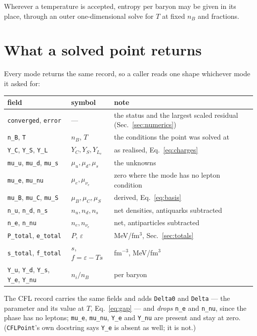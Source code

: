 \documentclass[aps,prc,onecolumn,superscriptaddress,nofootinbib,10pt]{revtex4-2}
\newcommand{\nB}{n_B}
\newcommand{\muB}{\mu_B}
\newcommand{\muC}{\mu_C}
\newcommand{\muS}{\mu_S}
\newcommand{\munue}{\mu_{\nu_e}}
\begin{document}
\medskip
Wherever a temperature is accepted, entropy per baryon may be given in its
place, through an outer one-dimensional solve for $T$ at fixed $\nB$ and
fractions.

\section{What a solved point returns}
\label{sec:returns}

Every mode returns the same record, so a caller reads one shape whichever mode
it asked for:

\begin{center}
\begin{tabular}{lll}
\toprule
field & symbol & note \\
\midrule
\texttt{converged}, \texttt{error} & --- & the status and the largest scaled
                                            residual (Sec.~\ref{sec:numerics}) \\
\texttt{n\_B}, \texttt{T} & $\nB$, $T$ & the conditions the point was solved at \\
\texttt{Y\_C}, \texttt{Y\_S}, \texttt{Y\_L} & $Y_C, Y_S, Y_{L_e}$ & as
                                            realised, Eq.~\eqref{eq:charges} \\
\texttt{mu\_u}, \texttt{mu\_d}, \texttt{mu\_s} & $\mu_u, \mu_d, \mu_s$ & the unknowns \\
\texttt{mu\_e}, \texttt{mu\_nu} & $\mu_e, \munue$ & zero where the mode has no
                                            lepton condition \\
\texttt{mu\_B}, \texttt{mu\_C}, \texttt{mu\_S} & $\muB, \muC, \muS$ & derived,
                                            Eq.~\eqref{eq:basis} \\
\texttt{n\_u}, \texttt{n\_d}, \texttt{n\_s} & $n_u, n_d, n_s$ & net densities,
                                            antiquarks subtracted \\
\texttt{n\_e}, \texttt{n\_nu} & $n_e, n_{\nu_e}$ & net, antiparticles subtracted \\
\texttt{P\_total}, \texttt{e\_total} & $P$, $\varepsilon$ & MeV/fm$^3$,
                                            Sec.~\ref{sec:totals} \\
\texttt{s\_total}, \texttt{f\_total} & $s$, $f = \varepsilon - Ts$ & fm$^{-3}$,
                                            MeV/fm$^3$ \\
\texttt{Y\_u}, \texttt{Y\_d}, \texttt{Y\_s}, \texttt{Y\_e}, \texttt{Y\_nu}
      & $n_i/\nB$ & per baryon \\
\bottomrule
\end{tabular}
\end{center}
%
The CFL record carries the same fields and adds \texttt{Delta0} and
\texttt{Delta} --- the parameter and its value at $T$, Eq.~\eqref{eq:gap} ---
and \emph{drops} \texttt{n\_e} and \texttt{n\_nu}, since the phase has no
leptons; \texttt{mu\_e}, \texttt{mu\_nu}, \texttt{Y\_e} and \texttt{Y\_nu}
are present and stay at zero. (\texttt{CFLPoint}'s own docstring says
\texttt{Y\_e} is absent as well; it is not.)
\end{document}

